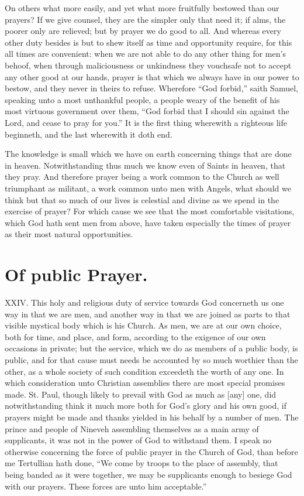 On others what more easily, and yet what more fruitfully bestowed than our prayers? If we give counsel, they are the simpler only that need it; if alms, the poorer only are relieved; but by prayer we do good to all. And whereas every other duty besides is but to shew itself as time and opportunity require, for this all times are convenient: when we are not able to do any other thing for men’s behoof, when through maliciousness or unkindness they vouchsafe not to accept any other good at our hands, prayer is that which we always have in our power to bestow, and they never in theirs to refuse. Wherefore “God forbid,” saith Samuel, speaking unto a most unthankful people, a people weary of the benefit of his most virtuous government over them, “God forbid that I should sin against the Lord, and cease to pray for you.” It is the first thing wherewith a righteous life beginneth, and the last wherewith it doth end.

The knowledge is small which we have on earth concerning things that are done in heaven. Notwithstanding thus much we know even of Saints in heaven, that they pray. And therefore prayer being a work common to the Church as well triumphant as militant, a work common unto men with Angels, what should we think but that so much of our lives is celestial and divine as we spend in the exercise of prayer? For which cause we see that the most comfortable visitations, which God hath sent men from above, have taken especially the times of prayer as their most natural opportunities.


\section*{Of public Prayer.}
XXIV. This holy and religious duty of service towards God concerneth us one way in that we are men, and another  way in that we are joined as parts to that visible mystical body which is his Church. As men, we are at our own choice, both for time, and place, and form, according to the exigence of our own occasions in private; but the service, which we do as members of a public body,
 is public, and for that cause must needs be accounted by so much worthier than the other, as a whole society of such condition exceedeth the worth of any one. In which consideration unto Christian assemblies there are most special promises made. St. Paul, though likely to prevail with God as much as [any] one, did notwithstanding think it much more both for God’s glory and his own good, if prayers might be made and thanks yielded in his behalf by a number of men. The prince and people of Nineveh assembling themselves as a main army of supplicants, it was not in the power of God to withstand them. I speak no otherwise concerning the force of public prayer in the Church of God, than before me Tertullian hath done, “We come by troops to the place of assembly, that being banded as it were together, we may be supplicants enough to besiege God with our prayers. These forces are unto him acceptable.”

